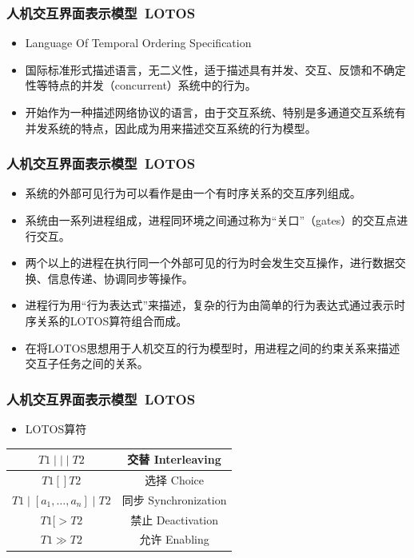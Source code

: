 \documentclass{beamer}
\begin{document}
\begin{frame}
	\frametitle{人机交互界面表示模型~{\small LOTOS}}
	\beamertemplatetransparentcovereddynamicmedium
	\begin{itemize}[<+->]
		\item Language Of Temporal Ordering Specification~\cite{bolognesi1987introduction}
		\item 国际标准形式描述语言，无二义性，适于描述具有并发、交互、反馈和不确定性等特点的并发（concurrent）系统中的行为。
		\item 开始作为一种描述网络协议的语言，由于交互系统、特别是多通道交互系统有并发系统的特点，因此成为用来描述交互系统的行为模型。
	\end{itemize}
\end{frame}

\begin{frame}
	\frametitle{人机交互界面表示模型~{\small LOTOS}}
	\beamertemplatetransparentcovereddynamicmedium
	\begin{itemize}[<+->]
		\item 系统的外部可见行为可以看作是由一个有时序关系的交互序列组成。
		\item 系统由一系列进程组成，进程同环境之间通过称为“关口”（gates）的交互点进行交互。
		\item 两个以上的进程在执行同一个外部可见的行为时会发生交互操作，进行数据交换、信息传递、协调同步等操作。
		\item 进程行为用“行为表达式”来描述，复杂的行为由简单的行为表达式通过表示时序关系的LOTOS算符组合而成。
		\item 在将LOTOS思想用于人机交互的行为模型时，用进程之间的约束关系来描述交互子任务之间的关系。 
	\end{itemize}
\end{frame}

\begin{frame}
	\frametitle{人机交互界面表示模型~{\small LOTOS}}
	\begin{itemize}
		\item LOTOS算符
	\end{itemize}
	\begin{center}
	\begin{tabular}{|c|c|}
	\hline $ T1 \mid\mid\mid T2 $ & 交替 Interleaving \\ 
	\hline $ T1 [] T2 $ & 选择 Choice \\ 
	\hline $ T1 \mid [a_1,\dots,a_n] \mid T2 $ & 同步 Synchronization \\ 
	\hline $ T1 [> T2 $ & 禁止 Deactivation \\ 
	\hline $ T1 \gg T2 $ & 允许 Enabling \\ 
	\hline 
	\end{tabular} 
	\end{center}
\end{frame}
\end{document}
